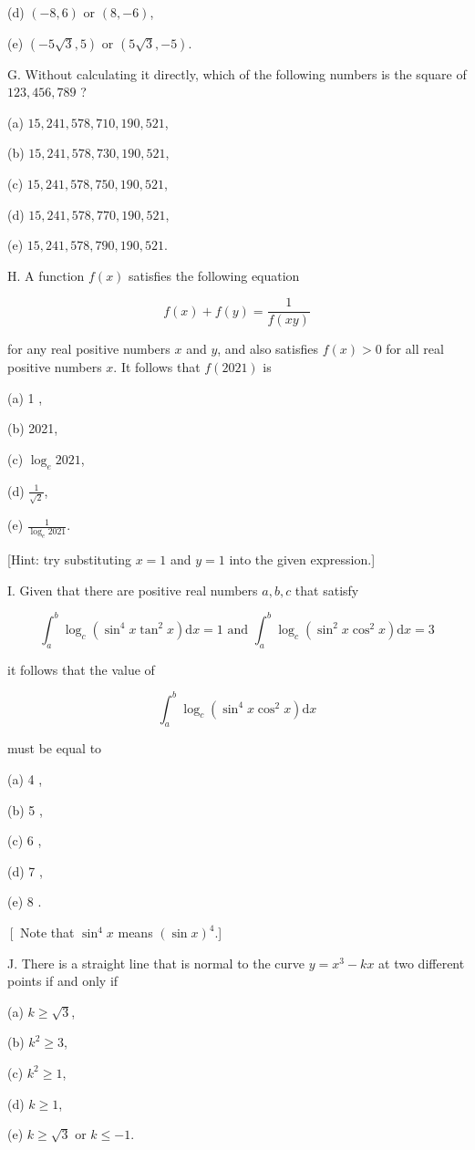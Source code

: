 \documentclass[10pt]{article}
\begin{document}
(d) $(-8,6)$ or $(8,-6)$,

(e) $(-5 \sqrt{3}, 5)$ or $(5 \sqrt{3},-5)$.

G. Without calculating it directly, which of the following numbers is the square of $123,456,789$ ?

(a) $15,241,578,710,190,521$,

(b) $15,241,578,730,190,521$,

(c) $15,241,578,750,190,521$,

(d) $15,241,578,770,190,521$,

(e) $15,241,578,790,190,521$.

H. A function $f(x)$ satisfies the following equation

$$
f(x)+f(y)=\frac{1}{f(x y)}
$$

for any real positive numbers $x$ and $y$, and also satisfies $f(x)>0$ for all real positive numbers $x$. It follows that $f(2021)$ is

(a) 1 ,

(b) 2021,

(c) $\log _{e} 2021$,

(d) $\frac{1}{\sqrt{2}}$,

(e) $\frac{1}{\log _{e} 2021}$.

[Hint: try substituting $x=1$ and $y=1$ into the given expression.]

I. Given that there are positive real numbers $a, b, c$ that satisfy

$$
\int_{a}^{b} \log _{c}\left(\sin ^{4} x \tan ^{2} x\right) \mathrm{d} x=1 \text { and } \int_{a}^{b} \log _{c}\left(\sin ^{2} x \cos ^{2} x\right) \mathrm{d} x=3
$$

it follows that the value of

$$
\int_{a}^{b} \log _{c}\left(\sin ^{4} x \cos ^{2} x\right) \mathrm{d} x
$$

must be equal to

(a) 4 ,

(b) 5 ,

(c) 6 ,

(d) 7 ,

(e) 8 .

$\left[\right.$ Note that $\sin ^{4} x$ means $(\sin x)^{4}$.]

J. There is a straight line that is normal to the curve $y=x^{3}-k x$ at two different points if and only if

(a) $k \geq \sqrt{3}$,

(b) $k^{2} \geq 3$,

(c) $k^{2} \geq 1$,

(d) $k \geq 1$,

(e) $k \geq \sqrt{3}$ or $k \leq-1$.
\end{document}
